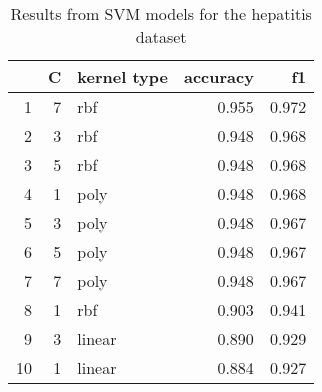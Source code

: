 \begin{table}
\centering
\caption{Results from SVM models for the hepatitis dataset}
\begin{tabular}{rrlrr}
\toprule
 & C & kernel type & accuracy & f1 \\
\midrule
1 & 7 & rbf & 0.955 & 0.972 \\
2 & 3 & rbf & 0.948 & 0.968 \\
3 & 5 & rbf & 0.948 & 0.968 \\
4 & 1 & poly & 0.948 & 0.968 \\
5 & 3 & poly & 0.948 & 0.967 \\
6 & 5 & poly & 0.948 & 0.967 \\
7 & 7 & poly & 0.948 & 0.967 \\
8 & 1 & rbf & 0.903 & 0.941 \\
9 & 3 & linear & 0.890 & 0.929 \\
10 & 1 & linear & 0.884 & 0.927 \\
\bottomrule
\end{tabular}
\end{table}
